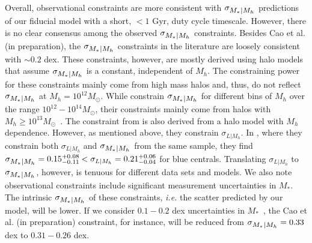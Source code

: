 \documentclass[12pt, letterpaper, preprint, tighten]{aastex62}
\newcommand{\cao}{Cao et al. (in preparation)}
\newcommand{\siglogm}{\sigma_{\scaleto{M_*|M_h}{8pt}}}
\begin{document}
Overall, observational constraints are more consistent with $\siglogm$ 
predictions of our fiducial model with a short, $< 1$ Gyr, duty cycle timescale. 
However, there is no clear consensus among the observed $\siglogm$ constraints. 
Besides \cao, the $\siglogm$ constraints in the literature are loosely 
consistent with $\sim 0.2$ dex. These constraints, however, are mostly derived 
using halo models that assume $\siglogm$ is a constant, independent of $M_h$. 
The constraining power for these constraints mainly come from high mass halos 
and, thus, do not reflect $\siglogm$ at $M_h=10^{12}M_\odot$.
While \cite{reddick2013} constrain $\siglogm$ for different bins of
$M_h$ over the range $10^{12} - 10^{14} M_\odot$, their constraints mainly come 
from halos with $M_h \ge 10^{13}M_\odot$~\citep{wechsler2018}. The constraint from
\cite{lange2018a} is also derived from a halo model with $M_h$ dependence. However, 
as mentioned above, they constrain $\sigma_{L|M_h}$. In \cite{more2011}, where 
they constrain both $\sigma_{L|M_h}$ and $\siglogm$ from the same sample, 
they find $\siglogm = 0.15\substack{+0.08\\ -0.11} < \sigma_{L|M_h} = 0.21\substack{+0.06\\ -0.04}$
for blue centrals. Translating $\sigma_{L|M_h}$ to $\siglogm$, however, 
is tenuous for different data sets and models. We also note observational constraints 
include significant measurement uncertainties in $M_*$. The intrinsic $\siglogm$ of 
these constraints, \emph{i.e.} the scatter predicted by our model, will be lower. 
If we consider $0.1 - 0.2$ dex uncertainties in $M_*$~\citep{roediger2015}, the
Cao et al. (in preparation) constraint, for instance, will be reduced from
$\siglogm = 0.33$ dex to $0.31 - 0.26$ dex. 
\end{document}
